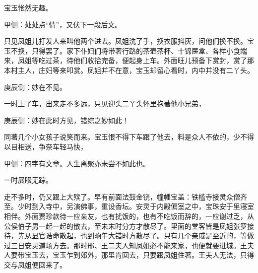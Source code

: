 \begin{parag}
    宝玉怅然无趣。\begin{note}甲侧：处处点“情”，又伏下一段后文。\end{note}只见凤姐儿打发人来叫他两个进去。凤姐洗了手，换衣服抖灰，问他们换不换。宝玉不换，只得罢了。家下仆妇们将带著行路的茶壶茶杯、十锦屉盒、各样小食端来，凤姐等吃过茶，待他们收拾完备，便起身上车。外面旺儿预备下赏封，赏了那本村主人，庄妇等来叩赏。凤姐并不在意，宝玉却留心看时，内中并没有二丫头。\begin{note}庚辰侧：妙在不见。\end{note}一时上了车，出来走不多远，只见迎头二丫头怀里抱著他小兄弟，\begin{note}庚辰侧：妙在此时方见，错综之妙如此！\end{note}同著几个小女孩子说笑而来。宝玉恨不得下车跟了他去，料是众人不依的，少不得以目相送，争奈车轻马快，\begin{note}甲侧：四字有文章。人生离聚亦未尝不如此也。\end{note}一时展眼无踪。
\end{parag}


\begin{parag}
    走不多时，仍又跟上大殡了。早有前面法鼓金铙，幢幡宝盖：铁槛寺接灵众僧齐至。少时到入寺中，另演佛事，重设香坛。安灵于内殿偏室之中，宝珠安于里寝室相伴。外面贾珍款待一应亲友，也有扰饭的，也有不吃饭而辞的，一应谢过乏，从公侯伯子男一起一起的散去，至未末时分方才散尽了。里面的堂客皆是凤姐张罗接待，先从显官诰命散起，也到晌午大错时方散尽了。只有几个亲戚是至近的，等做过三日安灵道场方去。那时邢、王二夫人知凤姐必不能来家，也便就要进城。王夫人要带宝玉去，宝玉乍到郊外，那里肯回去，只要跟凤姐住著。王夫人无法，只得交与凤姐便回来了。
\end{parag}


